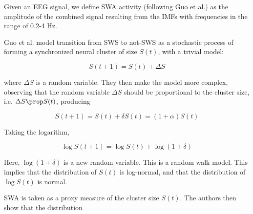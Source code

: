 \documentclass[a4paper, 12pt]{article}
\begin{document}
Given an EEG signal, we define SWA activity (following Guo et al.) as the
amplitude of the combined signal resulting from the IMFs with frequencies in the
range of 0.2-4 Hz. 

Guo et al. model transition from SWS to not-SWS as a stochastic process of
forming a synchronized neural cluster of size $S(t)$, with a trivial model: 

\begin{equation}
    S(t+1) = S(t) + \Delta S
\end{equation}

where $\Delta S$ is a random variable. They then make the model more complex,
observing that the random variable $\Delta S$ should be proportional to the
cluster size, i.e. $\Delta S \prop S(t)$, producing 

\begin{equation}
    S(t+1) = S(t) + \delta S(t) = (1+\alpha) S(t)
\end{equation}

Taking the logarithm, 

\begin{equation}
    \log S(t+1) = \log S(t) + \log(1+\delta) 
\end{equation}

Here, $\log(1 + \delta)$ is a new random variable. This is a random walk model. 
This implies that the distribution of $S(t)$ is log-normal, and that the
distribution of $\log S(t)$ is normal.

SWA is taken as a proxy measure of the cluster size $S(t)$. The authors then
show that the distribution 
\end{document}
